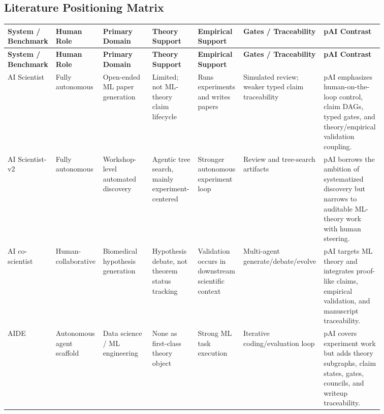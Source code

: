 \documentclass[11pt]{article}
\newcommand{\pai}{pAI}
\begin{document}
\begin{landscape}
\section*{Literature Positioning Matrix}
\small
\setlength{\tabcolsep}{3pt}
\begin{longtable}{>{\raggedright\arraybackslash}p{0.12\linewidth} >{\raggedright\arraybackslash}p{0.10\linewidth} >{\raggedright\arraybackslash}p{0.13\linewidth} >{\raggedright\arraybackslash}p{0.12\linewidth} >{\raggedright\arraybackslash}p{0.12\linewidth} >{\raggedright\arraybackslash}p{0.14\linewidth} >{\raggedright\arraybackslash}p{0.13\linewidth}}
\toprule
\textbf{System / Benchmark} & \textbf{Human Role} & \textbf{Primary Domain} & \textbf{Theory Support} & \textbf{Empirical Support} & \textbf{Gates / Traceability} & \textbf{\pai{} Contrast} \\
\midrule
\endfirsthead
\toprule
\textbf{System / Benchmark} & \textbf{Human Role} & \textbf{Primary Domain} & \textbf{Theory Support} & \textbf{Empirical Support} & \textbf{Gates / Traceability} & \textbf{\pai{} Contrast} \\
\midrule
\endhead
AI Scientist & Fully autonomous & Open-ended ML paper generation & Limited; not ML-theory claim lifecycle & Runs experiments and writes papers & Simulated review; weaker typed claim traceability & \pai{} emphasizes human-on-the-loop control, claim DAGs, typed gates, and theory/empirical validation coupling. \\
AI Scientist-v2 & Fully autonomous & Workshop-level automated discovery & Agentic tree search, mainly experiment-centered & Stronger autonomous experiment loop & Review and tree-search artifacts & \pai{} borrows the ambition of systematized discovery but narrows to auditable ML-theory work with human steering. \\
AI co-scientist & Human-collaborative & Biomedical hypothesis generation & Hypothesis debate, not theorem status tracking & Validation occurs in downstream scientific context & Multi-agent generate/debate/evolve & \pai{} targets ML theory and integrates proof-like claims, empirical validation, and manuscript traceability. \\
AIDE & Autonomous agent scaffold & Data science / ML engineering & None as first-class theory object & Strong ML task execution & Iterative coding/evaluation loop & \pai{} covers experiment work but adds theory subgraphs, claim states, gates, councils, and writeup traceability. \\

\end{longtable}
\end{landscape}
\end{document}
